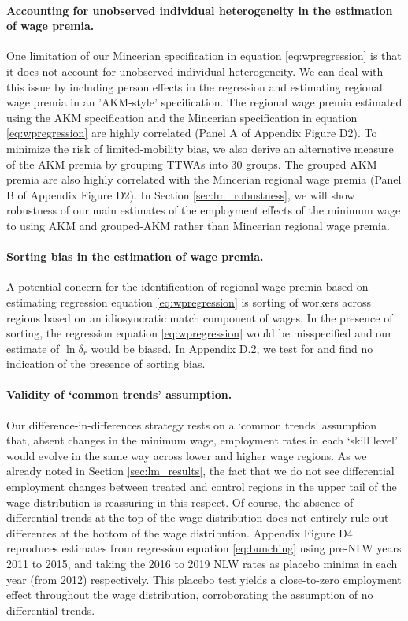 \paragraph{Accounting for unobserved individual heterogeneity in the estimation of wage premia.} One limitation of our Mincerian specification in equation \ref{eq:wpregression} is that it does not account for unobserved individual heterogeneity. We can deal with this issue by including person effects in the regression and estimating regional wage premia in an 'AKM-style' specification. The regional wage premia estimated using the AKM specification and the Mincerian specification in equation \ref{eq:wpregression} are highly correlated (Panel A of Appendix Figure D2). To minimize the risk of limited-mobility bias, we also derive an alternative measure of the AKM premia by grouping TTWAs into 30 groups. The grouped AKM premia are also highly correlated with the Mincerian regional wage premia (Panel B of Appendix Figure D2). In Section \ref{sec:lm_robustness}, we will show robustness of our main estimates of the employment effects of the minimum wage to using AKM and grouped-AKM rather than Mincerian regional wage premia.

\paragraph{Sorting bias in the estimation of wage premia.} A potential concern for the identification of regional wage premia based on estimating regression equation \ref{eq:wpregression} is sorting of workers across regions based on an idiosyncratic match component of wages. In the presence of sorting, the regression equation \ref{eq:wpregression} would be misspecified and our estimate of $\ln \delta_r$ would be biased. In Appendix D.2, we test for and find no indication of the presence of sorting bias.


\paragraph{Validity of `common trends' assumption.} Our difference-in-differences strategy rests on a `common trends' assumption that, absent changes in the minimum wage, employment rates in each `skill level’ would evolve in the same way across lower and higher wage regions. As we already noted in Section \ref{sec:lm_results}, the fact that we do not see differential employment changes between treated and control regions in the upper tail of the wage distribution is reassuring in this respect. Of course, the absence of differential trends at the top of the wage distribution does not entirely rule out differences at the bottom of the wage distribution. Appendix Figure D4 reproduces estimates from regression equation \ref{eq:bunching} using pre-NLW years 2011 to 2015, and taking the 2016 to 2019 NLW rates as placebo minima in each year (from 2012) respectively. This placebo test yields a close-to-zero employment effect throughout the wage distribution, corroborating the assumption of no differential trends. 

